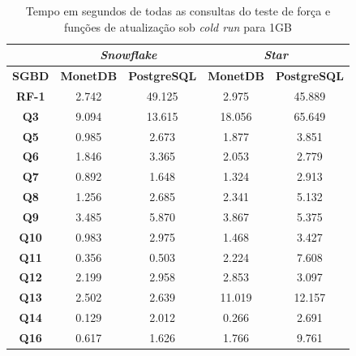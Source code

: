 \begin{table}[htpb]
        \centering
        \caption{Tempo em segundos de todas as consultas do teste de força e funções de atualização sob \textit{cold run} para 1GB}
        \label{tab:queries_cold_1}
        \begin{tabular}{|c|c|c|c|c|}
        \hline
        & \multicolumn{2}{c|}{\textit{\textbf{Snowflake}}} & \multicolumn{2}{c|}{\textit{\textbf{Star}}} \\ \hline
        \textbf{SGBD}  & \textbf{MonetDB}      & \textbf{PostgreSQL}      & \textbf{MonetDB}    & \textbf{PostgreSQL}   \\ \hline
        \textbf{RF-1}  & 2.742             & 49.125              & 2.975          & 45.889            \\ \hline
        \textbf{Q3}    & 9.094             & 13.615              & 18.056         & 65.649            \\ \hline
        \textbf{Q5}    & 0.985             & 2.673               & 1.877          & 3.851             \\ \hline
        \textbf{Q6}    & 1.846             & 3.365               & 2.053          & 2.779             \\ \hline
        \textbf{Q7}    & 0.892             & 1.648               & 1.324          & 2.913             \\ \hline
        \textbf{Q8}    & 1.256             & 2.685               & 2.341          & 5.132             \\ \hline
        \textbf{Q9}    & 3.485             & 5.870               & 3.867          & 5.375             \\ \hline
        \textbf{Q10}   & 0.983             & 2.975               & 1.468          & 3.427             \\ \hline
        \textbf{Q11}   & 0.356             & 0.503               & 2.224          & 7.608             \\ \hline
        \textbf{Q12}   & 2.199             & 2.958               & 2.853          & 3.097             \\ \hline
        \textbf{Q13}   & 2.502             & 2.639               & 11.019         & 12.157            \\ \hline
        \textbf{Q14}   & 0.129             & 2.012               & 0.266          & 2.691             \\ \hline
        \textbf{Q16}   & 0.617             & 1.626               & 1.766          & 9.761             \\ \hline

\end{tabular}
\end{table}
